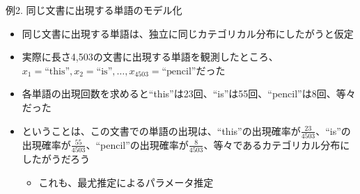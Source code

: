 \documentclass[aspectratio=169,unicode,dvipdfmx,14pt]{beamer}
\begin{document}
\begin{frame}{例2. 同じ文書に出現する単語のモデル化}
\begin{itemize}
\item 同じ文書に出現する単語は、独立に同じカテゴリカル分布にしたがうと仮定
\item 実際に長さ4,503の文書に出現する単語を観測したところ、$x_1=\mbox{``this''}, x_2=\mbox{``is''}, \ldots, x_{4503}=\mbox{``pencil''}$だった
\item 各単語の出現回数を求めると``this''は23回、``is''は55回、``pencil''は8回、等々だった
\item ということは、この文書での単語の出現は、``this''の出現確率が$\frac{23}{4503}$、``is''の出現確率が$\frac{55}{4503}$、``pencil''の出現確率が$\frac{8}{4503}$、等々であるカテゴリカル分布にしたがうだろう
\begin{itemize}
\item これも、最尤推定によるパラメータ推定
\end{itemize}
\end{itemize}
\end{frame}
\end{document}
